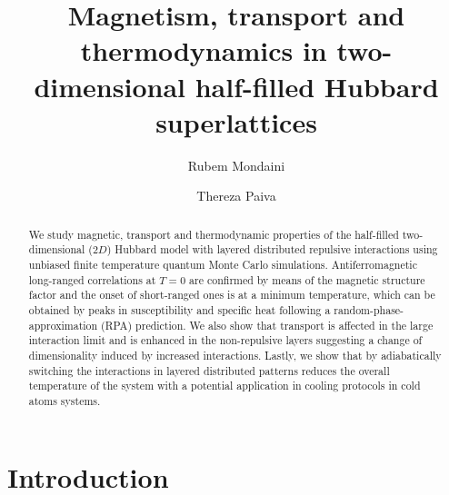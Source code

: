 \documentclass[aps,pra,reprint,twocolumn,showpacs,longbibliography,superscriptaddress]{revtex4-1}
\begin{document}
\title{Magnetism, transport and thermodynamics in two-dimensional half-filled Hubbard superlattices}
\author{Rubem Mondaini}
\author{Thereza Paiva}


\begin{abstract}
We study magnetic, transport and thermodynamic properties of the half-filled two-dimensional ($2D$) Hubbard model with layered distributed repulsive interactions using unbiased finite temperature quantum Monte Carlo simulations. Antiferromagnetic long-ranged correlations at $T=0$ are confirmed by means of the magnetic structure factor and the onset of short-ranged ones is at a minimum temperature, which can be obtained by peaks in susceptibility and specific heat following a random-phase-approximation (RPA) prediction. We also show that transport is affected in the large interaction limit and is enhanced in the non-repulsive layers suggesting a change of dimensionality induced by increased interactions. Lastly, we show that by adiabatically switching the interactions in layered distributed patterns reduces the overall temperature of the system with a potential application in cooling protocols in cold atoms systems.
\end{abstract}
\maketitle

\section{Introduction}
\end{document}
